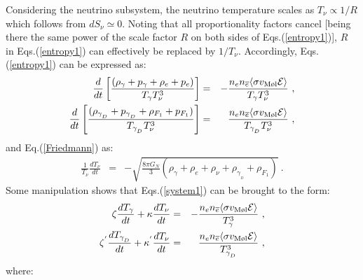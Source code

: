 \documentclass[12pt]{article}
\begin{document}
Considering the neutrino subsystem, the neutrino temperature scales as
$T _{\nu} \propto 1/R$ which follows from $dS _{\nu} \simeq 0$. Noting
that all proportionality factors cancel [being there the same power of
the scale factor $R$ on both sides of Eqs.(\ref{entropy1})], $R$ in
Eqs.(\ref{entropy1}) can effectively be replaced by $1/T _{\nu}$.
Accordingly, Eqs.(\ref{entropy1}) can be expressed as:
%
\begin{eqnarray}
\frac{d}{dt} \left [ \frac{(\rho _{\gamma} + p _{\gamma} + \rho _e + p
_e)}{T _{\gamma} T _{\nu} ^3}\right ] 
&=& - \frac{n _e n _{\overline{e}} \langle \sigma v_{\text {M\o l}}
{\cal E} \rangle }{T _{\gamma} T _{\nu} ^3} \ , \nonumber \\
\frac{d}{dt} \left [ \frac{(\rho _{\gamma _{_D}} + p _{\gamma _{_D}} +
\rho _{F_1} + p _{F_1})}{T _{\gamma _{_D}}T _{\nu} ^3}\right ] 
&=& \frac{n _e n _{\overline{e}} \langle \sigma v_{\text{M\o l}} {\cal
E} \rangle }{T _{\gamma _{_D}}T _{\nu} ^3} \ ,
\label{system1}
\end{eqnarray}
%
and Eq.(\ref{Friedmann}) as:
%
\begin{eqnarray}
\frac{1}{T _{\nu}} \frac{dT _{\nu}}{dt} &=& - \sqrt{\frac{8\pi G_N}{3}
\left ( \rho _{\gamma} + 
\rho _e + \rho _{\nu} + \rho _{\gamma _{_D}} + \rho _{F_1} \right )} \ .
\label{friedmannbis}
\end{eqnarray}
%
Some manipulation shows that Eqs.(\ref{system1}) can be brought to the
form:
%
\begin{eqnarray}
\zeta \frac{dT _{\gamma}}{dt} + \kappa \frac{dT _{\nu}}{dt} 
&=& - \frac{n _{e} n _{\overline{e}} \langle \sigma v _{\text{M\o l}}
{\cal E} \rangle }{T _{\gamma} ^3} \ , \nonumber \\
\zeta ^{'} \frac{dT _{\gamma _{_D}}}{dt} + \kappa ^{'} \frac{dT
_{\nu}}{dt} 
&=& \frac{n _{e} n _{\overline{e}} \langle \sigma v _{\text{M\o l}}
{\cal E} \rangle }{T _{\gamma _{_D}} ^3} \ ,
\label{sistema1}
\end{eqnarray}
%
where:
%
\end{document}
